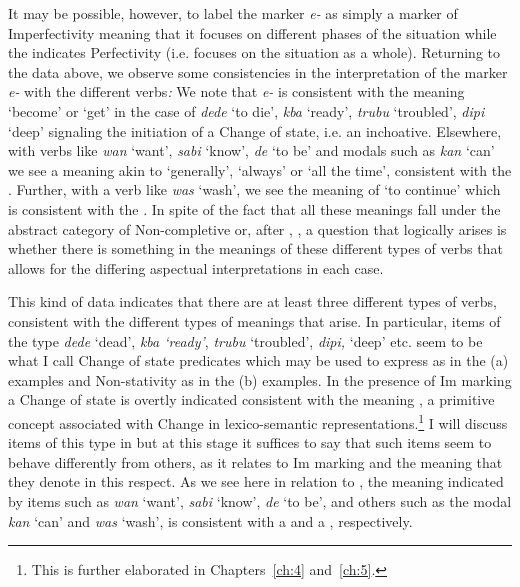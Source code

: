 It may be possible, however,  to label the marker \textit{e-} as simply a
marker of Imperfectivity meaning that it focuses on different phases
of the situation \citep{Comrie1976} while the  indicates
Perfectivity (i.e. focuses on the situation as a whole).  Returning
to the data above, we observe some consistencies in the interpretation
of the marker \textit{e-} with the different verbs\textit{:} We note
that \textit{e-} is consistent with the meaning  `become’ or  `get’
in the case of \textit{dede} `to die', \textit{kba} `ready',
\textit{trubu} `troubled', \textit{dipi} `deep' signaling the
initiation of a Change of state, i.e. an inchoative.  Elsewhere, with
verbs like \textit{wan} ‘want’, \textit{sabi} `know', \textit{de} `to
be' and modals such as \textit{kan} `can' we see a meaning akin to
`generally', `always' or `all the time', consistent with the .
Further, with a verb like \textit{was} `wash', we see the meaning of
`to continue' which is consistent with the .  In spite of
the fact that all these meanings fall under the abstract category of
Non-completive or, after \citet{Comrie1976}, , a question
that logically arises is whether there is something in the meanings of
these different types of verbs that allows for the differing aspectual
interpretations in each case.

This kind of data indicates that there are at least three different
types of verbs, consistent with the different types of 
meanings that arise.  In particular, items of the type \textit{dede
} `dead', \textit{kba `ready'}, \textit{trubu} `troubled',
\textit{dipi,} `deep' etc. seem to be what I call Change of state
predicates which may be used to express  as in the (a)
examples and Non-stativity as in the (b) examples.  In the presence of
Im marking a Change of state is overtly indicated
consistent with the meaning \BECOME, a primitive concept associated
with Change in lexico-semantic representations.\footnote{This is
  further elaborated in Chapters~\ref{ch:4} and~\ref{ch:5}.}  I will discuss items
of this type in  but at this stage it suffices to say that
such items seem to behave differently from others, as it relates to
Im marking and the meaning that they denote in this
respect.  As we see here in relation to , the meaning indicated
by items such as \textit{wan} `want', \textit{sabi} `know',
\textit{de} `to be', and others such as the modal \textit{kan} `can'
and \textit{was} `wash', is consistent with a  and a
, respectively.

